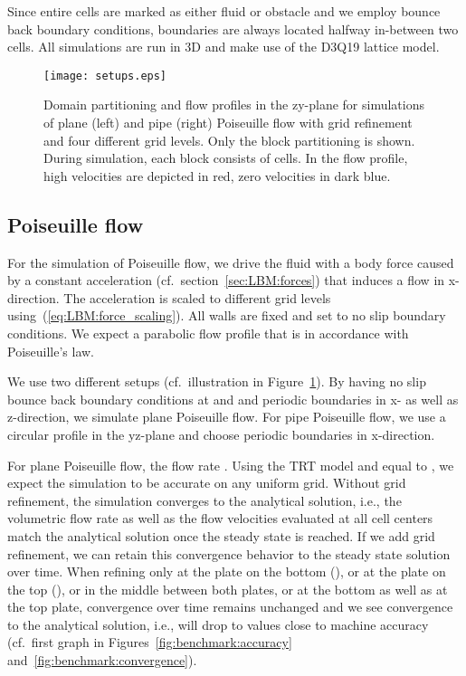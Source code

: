 \documentclass[final,leqno,onefignum,onetabnum]{siamltex1213}
\begin{document}
Since entire cells are marked as either fluid or obstacle and we employ bounce back boundary conditions, boundaries are always located halfway in-between two cells.
All simulations are run in 3D and make use of the D3Q19 lattice model.

\begin{figure}[tbp]
  \centering
  \texttt{[image: setups.eps]}
  \caption{Domain partitioning and flow profiles in the zy-plane for simulations of plane (left) and pipe (right) Poiseuille flow
with grid refinement and four different grid levels.
Only the block partitioning is shown. During simulation, each block consists of  cells.
In the flow profile, high velocities are depicted in red, zero velocities in dark blue.}
  \label{fig:benchmark:setups}
\end{figure}

\subsection{Poiseuille flow}\label{sec:benchmarks:poiseuille}

For the simulation of Poiseuille flow,
we drive the fluid with a body force caused by a constant acceleration (cf.\ section~\ref{sec:LBM:forces}) that induces a flow in x-direction.
The acceleration is scaled to different grid levels using~(\ref{eq:LBM:force_scaling}).
All walls are fixed and set to no slip boundary conditions.
We expect a parabolic flow profile that is in accordance with Poiseuille's law.

We use two different setups (cf.\ illustration in Figure~\ref{fig:benchmark:setups}).
By having no slip bounce back boundary conditions at  and  and periodic boundaries in x- as well as z-direction, we simulate plane Poiseuille flow.
For pipe Poiseuille flow, we use a circular profile in the yz-plane and choose periodic boundaries in x-direction.

For plane Poiseuille flow, the flow rate .
Using the TRT model and  equal to , we expect the simulation to be accurate on any uniform grid.
Without grid refinement, the simulation converges to the analytical solution, i.e.,
the volumetric flow rate as well as the flow velocities evaluated at all cell centers match the analytical solution once the steady state is reached.
If we add grid refinement, we can retain this convergence behavior to the steady state solution over time.
When refining only at the plate on the bottom (), or at the plate on the top (), or in the middle between both plates, or at the bottom as well as at the top plate,
convergence over time remains unchanged and we see convergence to the analytical solution, i.e.,  will drop to values close to machine accuracy (cf.\ first graph in Figures~\ref{fig:benchmark:accuracy} and~\ref{fig:benchmark:convergence}).
\end{document}
